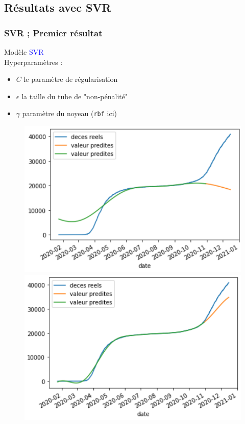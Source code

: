 \documentclass{beamer}[aspectratio = 43]
\begin{document}
\subsection{Résultats avec SVR}
\begin{frame}
	\frametitle{SVR ; Premier résultat}
	Modèle \textcolor{blue}{SVR}%
	\\
	Hyperparamètres :
	\begin{itemize}
		\item[]$C$ le paramètre de régularisation
		\item[]$\epsilon$ la taille du tube de "non-pénalité"
		\item[]$\gamma$ paramètre du noyeau (\texttt{rbf} ici)
	\end{itemize}
	\begin{figure}[h]
		\centering
		\begin{minipage}{0.5\textwidth}
			\includegraphics[scale=0.4]{svr100_}
		\end{minipage}%
		\begin{minipage}{0.5\textwidth}
			\includegraphics[scale=0.4]{svr100000_}

\end{minipage}
\end{figure}
\end{frame}
\end{document}
